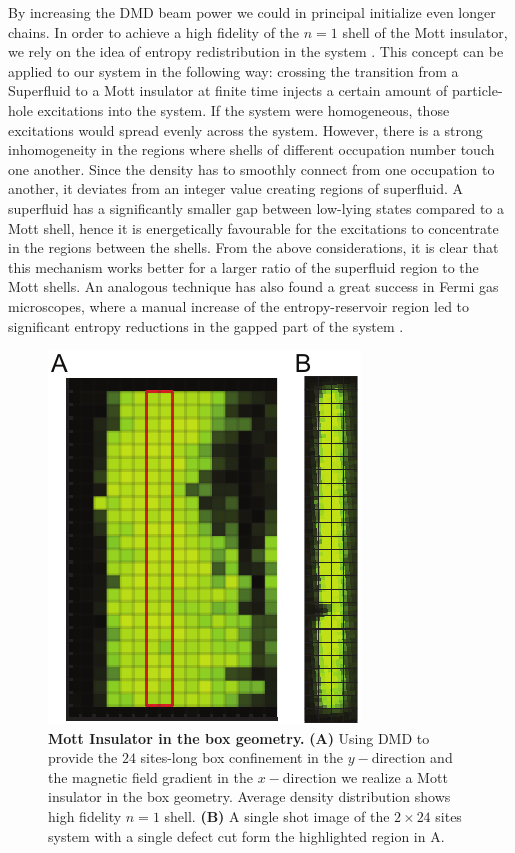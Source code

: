 By increasing the DMD beam power we could in principal initialize even longer chains. In order to achieve a high fidelity of the $n=1$ shell of the Mott insulator, we rely on the idea of entropy redistribution in the system \cite{Ho2009}. This concept can be applied to our system in the following way: crossing the transition from a Superfluid to a Mott insulator at finite time injects a certain amount of particle-hole excitations into the system. If the system were homogeneous, those excitations would spread evenly across the system. However, there is a strong inhomogeneity in the regions where shells of different occupation number touch one another. Since the density has to smoothly connect from one occupation to another, it deviates from an integer value creating regions of superfluid. A superfluid has a significantly smaller gap between low-lying states compared to a Mott shell, hence it is energetically favourable for the excitations to concentrate in the regions between the shells. From the above considerations, it is clear that this mechanism works better for a larger ratio of the superfluid region to the Mott shells. An analogous technique has also found a great success in Fermi gas microscopes, where a manual increase of the entropy-reservoir region led to significant entropy reductions in the gapped part of the system \cite{Mazurenko2017, Chiu2018}.

\begin{figure}[t]
	\centering
	\includegraphics[scale=1]{figures/CTE_MI_box.pdf}
	\caption{{\bf Mott Insulator in the box geometry.} {\bf (A)} Using DMD to provide the $24$ sites-long box confinement in the $y-\mathrm{direction}$ and the magnetic field gradient in the $x-\mathrm{direction}$ we realize a Mott insulator in the box geometry. Average density distribution shows high fidelity $n=1$ shell.  {\bf (B)} A single shot image of the $2\times24$ sites system with a single defect cut form the highlighted region in A.}
	\label{fig:CTE_MI_box}
\end{figure}

